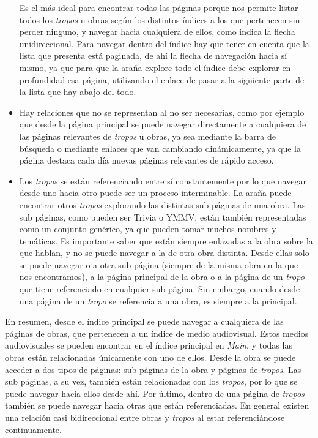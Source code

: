 \begin{itemize}
  Es el más ideal para encontrar todas las páginas porque nos permite listar
  todos los \textit{tropos} u obras según los distintos índices a los que
  pertenecen sin perder ninguno, y navegar hacia cualquiera de ellos, como
  indica la flecha unidireccional. Para navegar dentro del índice hay que tener
  en cuenta que la lista que presenta está paginada, de ahí la flecha de
  navegación hacia sí mismo, ya que para que la araña explore todo el índice
  debe explorar en profundidad esa página, utilizando el enlace de pasar a la
  siguiente parte de la lista que hay abajo del todo.
  \item Hay relaciones que no se representan al no ser necesarias, como por
  ejemplo que desde la página principal se puede navegar directamente a
  cualquiera de las páginas relevantes de \textit{tropos} u obras, ya sea
  mediante la barra de búsqueda o mediante enlaces que van cambiando
  dinámicamente, ya que la página destaca cada día nuevas páginas relevantes de
  rápido acceso.
  \item Los \textit{tropos} se están referenciando entre sí constantemente por
  lo que navegar desde uno hacia otro puede ser un proceso interminable. La
  araña puede encontrar otros \textit{tropos} explorando las distintas sub
  páginas de una obra. Las sub páginas, como pueden ser Trivia o YMMV, están
  también representadas como un conjunto genérico, ya que pueden tomar muchos
  nombres y temáticas. Es importante saber que están siempre enlazadas a la obra
  sobre la que hablan, y no se puede navegar a la de otra obra distinta. Desde
  ellas solo se puede navegar o a otra sub página (siempre de la misma obra en
  la que nos encontramos), a la página principal de la obra o a la página de un
  \textit{tropo} que tiene referenciado en cualquier sub página. Sin embargo,
  cuando desde una página de un \textit{tropo} se referencia a una obra, es
  siempre a la principal.
\end{itemize}

En resumen, desde el índice principal se puede navegar a cualquiera de las
páginas de obras, que pertenecen a un índice de medio audiovisual. Estos medios
audiovisuales se pueden encontrar en el índice principal en \textit{Main}, y
todas las obras están relacionadas únicamente con uno de ellos. Desde la obra se
puede acceder a dos tipos de páginas: sub páginas de la obra y páginas de
\textit{tropos}. Las sub páginas, a su vez, también están relacionadas con los
\textit{tropos}, por lo que se puede navegar hacia ellos desde ahí. Por último,
dentro de una página de \textit{tropos} también se puede navegar hacia otras que
están referenciadas. En general existen una relación casi bidireccional entre
obras y \textit{tropos} al estar referenciándose continuamente. 

